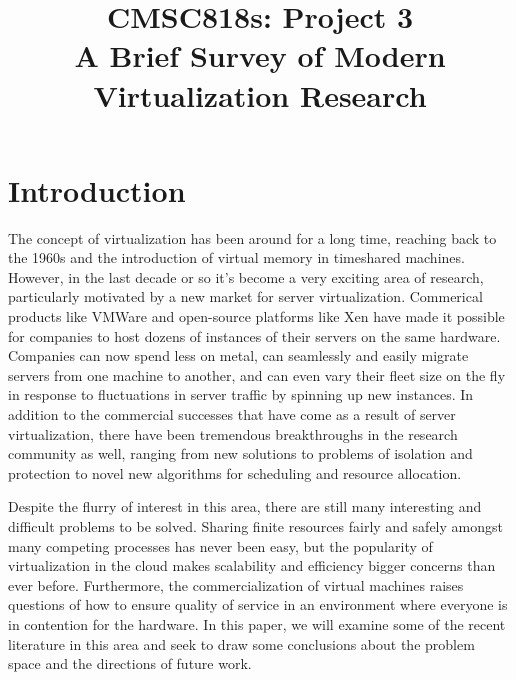 \documentclass[letterpaper, twocolumn]{article}
\title{CMSC818s: Project 3 \\
A Brief Survey of Modern Virtualization Research}
\author{}
\date{}
\begin{document}

\section{Introduction}
\label{sec:intro}

The concept of virtualization has been around for a long time, reaching back
to the 1960s and the introduction of virtual memory in timeshared machines.
However, in the last decade or so it's become a very exciting area of research,
particularly motivated by a new market for server virtualization.  Commerical
products like VMWare and open-source platforms like Xen \cite{ref:xen} have made
it possible for companies to host dozens of instances of their servers
on the same hardware.  Companies can now spend less on metal, can seamlessly and
easily migrate servers from one machine to another, and can even vary their fleet
size on the fly in response to fluctuations in server traffic by spinning up new
instances.  In addition to the commercial successes that have come as a result
of server virtualization, there have been tremendous breakthroughs in the research
community as well, ranging from new solutions to problems of isolation and protection
to novel new algorithms for scheduling and resource allocation.

Despite the flurry of interest in this area, there are still many interesting
and difficult problems to be solved.  Sharing finite resources
fairly and safely amongst many competing processes has never been easy, but
the popularity of virtualization in the cloud makes scalability and efficiency
bigger concerns than ever before.  Furthermore, the commercialization of
virtual machines raises questions of how to ensure quality of service in
an environment where everyone is in contention for the hardware.  In this
paper, we will examine some of the recent literature in this area and
seek to draw some conclusions about the problem space and the directions
of future work.
\end{document}
